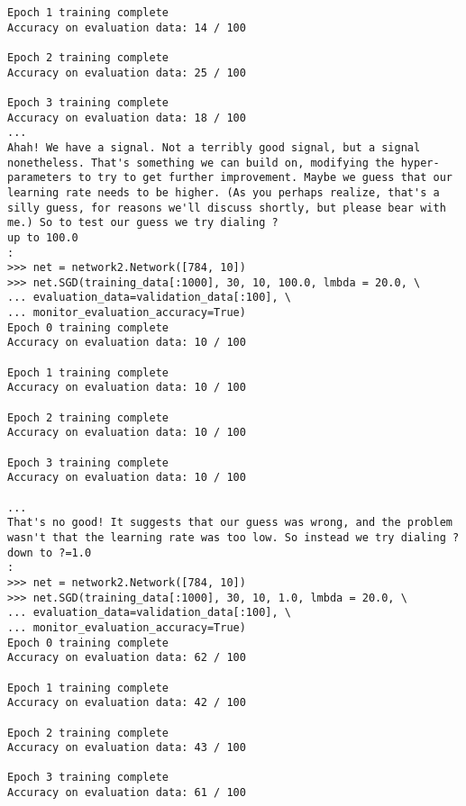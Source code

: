 \begin{lstlisting}
Epoch 1 training complete
Accuracy on evaluation data: 14 / 100

Epoch 2 training complete
Accuracy on evaluation data: 25 / 100

Epoch 3 training complete
Accuracy on evaluation data: 18 / 100
...
Ahah! We have a signal. Not a terribly good signal, but a signal nonetheless. That's something we can build on, modifying the hyper-parameters to try to get further improvement. Maybe we guess that our learning rate needs to be higher. (As you perhaps realize, that's a silly guess, for reasons we'll discuss shortly, but please bear with me.) So to test our guess we try dialing ?
up to 100.0
:
>>> net = network2.Network([784, 10])
>>> net.SGD(training_data[:1000], 30, 10, 100.0, lmbda = 20.0, \
... evaluation_data=validation_data[:100], \
... monitor_evaluation_accuracy=True)
Epoch 0 training complete
Accuracy on evaluation data: 10 / 100

Epoch 1 training complete
Accuracy on evaluation data: 10 / 100

Epoch 2 training complete
Accuracy on evaluation data: 10 / 100

Epoch 3 training complete
Accuracy on evaluation data: 10 / 100

...
That's no good! It suggests that our guess was wrong, and the problem wasn't that the learning rate was too low. So instead we try dialing ?
down to ?=1.0
:
>>> net = network2.Network([784, 10])
>>> net.SGD(training_data[:1000], 30, 10, 1.0, lmbda = 20.0, \
... evaluation_data=validation_data[:100], \
... monitor_evaluation_accuracy=True)
Epoch 0 training complete
Accuracy on evaluation data: 62 / 100

Epoch 1 training complete
Accuracy on evaluation data: 42 / 100

Epoch 2 training complete
Accuracy on evaluation data: 43 / 100

Epoch 3 training complete
Accuracy on evaluation data: 61 / 100


\end{lstlisting}
